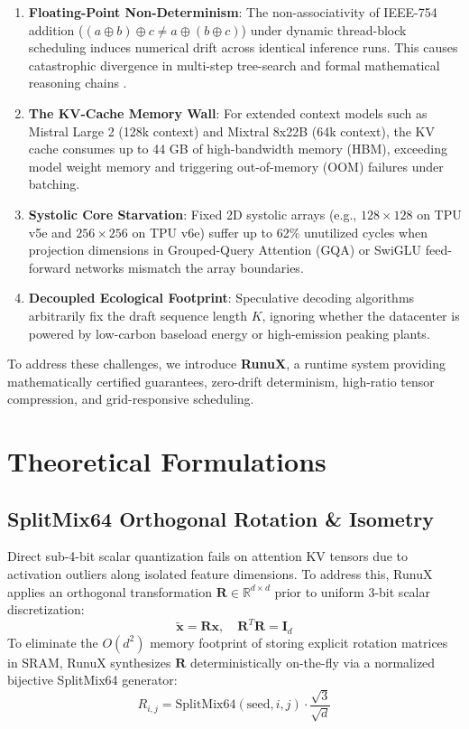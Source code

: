 \documentclass[10pt,twocolumn]{article}
\begin{document}
\begin{enumerate}
    \item \textbf{Floating-Point Non-Determinism}: The non-associativity of IEEE-754 addition ($ (a \oplus b) \oplus c \neq a \oplus (b \oplus c) $) under dynamic thread-block scheduling induces numerical drift across identical inference runs. This causes catastrophic divergence in multi-step tree-search and formal mathematical reasoning chains \cite{dao2022flashattention}.
    \item \textbf{The KV-Cache Memory Wall}: For extended context models such as Mistral Large 2 (128k context) and Mixtral 8x22B (64k context), the KV cache consumes up to 44 GB of high-bandwidth memory (HBM), exceeding model weight memory and triggering out-of-memory (OOM) failures under batching.
    \item \textbf{Systolic Core Starvation}: Fixed 2D systolic arrays (e.g., $128 \times 128$ on TPU v5e and $256 \times 256$ on TPU v6e) suffer up to 62\% unutilized cycles when projection dimensions in Grouped-Query Attention (GQA) or SwiGLU feed-forward networks mismatch the array boundaries.
    \item \textbf{Decoupled Ecological Footprint}: Speculative decoding algorithms arbitrarily fix the draft sequence length $K$, ignoring whether the datacenter is powered by low-carbon baseload energy or high-emission peaking plants.
\end{enumerate}

To address these challenges, we introduce \textbf{RunuX}, a runtime system providing mathematically certified guarantees, zero-drift determinism, high-ratio tensor compression, and grid-responsive scheduling.

\section{Theoretical Formulations}

\subsection{SplitMix64 Orthogonal Rotation \& Isometry}

Direct sub-4-bit scalar quantization fails on attention KV tensors due to activation outliers along isolated feature dimensions. To address this, RunuX applies an orthogonal transformation $\mathbf{R} \in \mathbb{R}^{d \times d}$ prior to uniform 3-bit scalar discretization:
\begin{equation}
    \tilde{\mathbf{x}} = \mathbf{R} \mathbf{x}, \quad \mathbf{R}^T \mathbf{R} = \mathbf{I}_d
\end{equation}
To eliminate the $O(d^2)$ memory footprint of storing explicit rotation matrices in SRAM, RunuX synthesizes $\mathbf{R}$ deterministically on-the-fly via a normalized bijective SplitMix64 generator:
\begin{equation}
    R_{i,j} = \mathrm{SplitMix64}(\mathrm{seed}, i, j) \cdot \frac{\sqrt{3}}{\sqrt{d}}
\end{equation}
\end{document}
